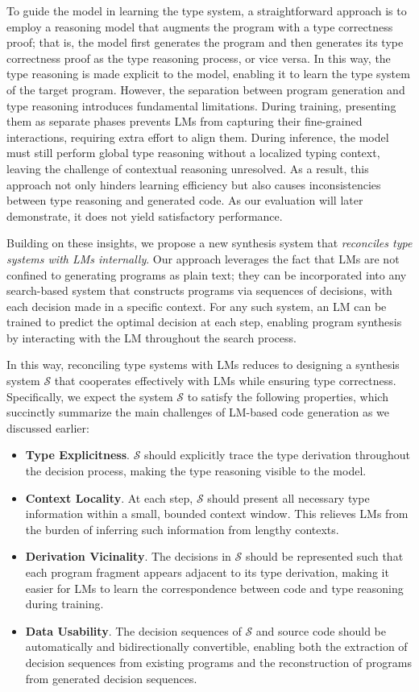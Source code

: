 To guide the model in learning the type system, a straightforward approach is to employ a reasoning model that augments the program with a type correctness proof; that is, the model first generates the program and then generates its type correctness proof as the type reasoning process, or vice versa. In this way, the type reasoning is made explicit to the model, enabling it to learn the type system of the target program.
%
However, the separation between program generation and type reasoning introduces fundamental limitations. During training, presenting them as separate phases prevents LMs from capturing their fine-grained interactions, requiring extra effort to align them. During inference, the model must still perform global type reasoning without a localized typing context, leaving the challenge of contextual reasoning unresolved.
%
As a result, this approach not only hinders learning efficiency but also causes inconsistencies between type reasoning and generated code. As our evaluation will later demonstrate, it does not yield satisfactory performance.

Building on these insights, we propose a new synthesis system that \emph{reconciles type systems with LMs internally}. 
Our approach leverages the fact that LMs are not confined to generating programs as plain text; they can be incorporated into any search-based system that constructs programs via sequences of decisions, with each decision made in a specific context. 
For any such system, an LM can be trained to predict the optimal decision at each step, enabling program synthesis by interacting with the LM throughout the search process.

In this way, reconciling type systems with LMs reduces to designing a synthesis system $\mathcal S$ that cooperates effectively with LMs while ensuring type correctness.
Specifically, we expect the system $\mathcal S$ to satisfy the following properties, which succinctly summarize the main challenges of LM-based code generation as we discussed earlier:
\begin{itemize}
 \item \textbf{Type Explicitness}. $\mathcal{S}$ should explicitly trace the type derivation throughout the decision process, making the type reasoning visible to the model.
 \item \textbf{Context Locality}. At each step, $\mathcal{S}$ should present all necessary type information within a small, bounded context window. This relieves LMs from the burden of inferring such information from lengthy contexts.
 \item \textbf{Derivation Vicinality}. The decisions in $\mathcal{S}$ should be represented such that each program fragment appears adjacent to its type derivation, making it easier for LMs to learn the correspondence between code and type reasoning during training.
 \item \textbf{Data Usability}. The decision sequences of $\mathcal{S}$ and source code should be automatically and bidirectionally convertible, enabling both the extraction of decision sequences from existing programs and the reconstruction of programs from generated decision sequences.
\end{itemize}

